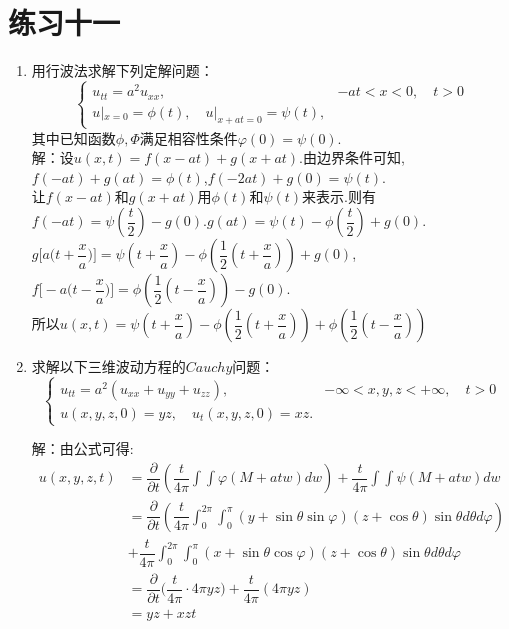 \documentclass[11pt]{article}
\begin{document}
\section*{练习十一}
    \begin{enumerate}
    \item 用行波法求解下列定解问题：
       \[
    \left\{
     \begin{array}{lr}
     u_{tt}=a^2u_{xx}, &-at<x<0,\quad t>0 \\
     u|_{x=0}=\phi(t),\quad u|_{x+at=0}=\psi(t),
     \end{array}
    \right. \]
    其中已知函数$\phi,\varPhi$满足相容性条件$\varphi(0)=\psi(0)$.\\
        解：设$u(x,t)=f(x-at)+g(x+at)$.由边界条件可知,$f(-at)+g(at)=\phi(t)$,$f(-2at)+g(0)=\psi(t)$.\\让$f(x-at)$和$g(x+at)$用$\phi(t)$和$\psi(t)$来表示.则有$f(-at)=\psi(\dfrac{t}{2})-g(0)$.$g(at)=\psi(t)-\phi(\dfrac{t}{2})+g(0)$.\\$g\big[a\big(t+\dfrac{x}{a}\big)\big]=\psi(t+\dfrac{x}{a})-\phi(\dfrac{1}{2}(t+\dfrac{x}{a}))+g(0)$,$f\big[-a\big(t-\dfrac{x}{a}\big)\big]=\phi(\dfrac{1}{2}(t-\dfrac{x}{a}))-g(0)$.\\[8pt]所以$u(x,t)=\psi(t+\dfrac{x}{a})-\phi(\dfrac{1}{2}(t+\dfrac{x}{a}))+\phi(\dfrac{1}{2}(t-\dfrac{x}{a}))$

    \item  求解以下三维波动方程的$Cauchy$问题：
    \[
    \left\{
     \begin{array}{lr}
     u_{tt}=a^2(u_{xx}+u_{yy}+u_{zz}),& -\infty<x,y,z<+\infty,\quad t>0 \\
     u(x,y,z,0)=yz,\quad u_t(x,y,z,0)=xz.
     \end{array}
    \right. \]

    解：由公式可得:
    \begin{align*}
    u(x,y,z,t) &= \dfrac{\partial}{\partial t}\left(\dfrac{t}{4\pi}\int\int \varphi(M+atw)dw\right) + \dfrac{t}{4\pi}\int\int \psi(M+atw)dw  \nonumber    \\[8pt]
           &= \dfrac{\partial}{\partial t}\left(\dfrac{t}{4\pi}\int_{0}^{2\pi}\int_{0}^{\pi} (y+\sin\theta\sin\varphi)(z+\cos\theta)\sin\theta d\theta d\varphi\right) \nonumber    \\
           & + \dfrac{t}{4\pi}\int_{0}^{2\pi}\int_{0}^{\pi} (x+\sin\theta\cos\varphi)(z+\cos\theta)\sin\theta d\theta d\varphi \nonumber    \\
           &= \dfrac{\partial}{\partial t}\big(\dfrac{t}{4\pi}\cdot 4\pi yz\big)+\dfrac{t}{4\pi}(4\pi yz)\\
           &=yz+xzt
\end{align*}



\end{enumerate}
\end{document}
